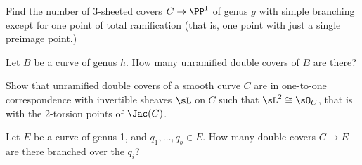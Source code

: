 \begin{exercise}
Find the number of 3-sheeted covers $C \to \PP^1$ of genus $g$ with simple branching except for one point of total ramification (that is, one point with just a single preimage point.)

\end{exercise}


\begin{exercise}
Let $B$ be a curve of genus $h$. How many unramified double covers of $B$ are there?

\end{exercise}

\begin{exercise}
Show that unramified double covers of a smooth curve $C$ are in one-to-one correspondence
with invertible sheaves $\sL$ on $C$ such that $\sL^2 \cong \sO_C$, that is with the 2-torsion points
of $\Jac(C)$.

\end{exercise}


\begin{exercise} Let $E$ be a curve of genus 1, and $q_1,\dots,q_b \in E$. How many double covers $C \to E$ are there branched over the $q_i$?

\end{exercise}



